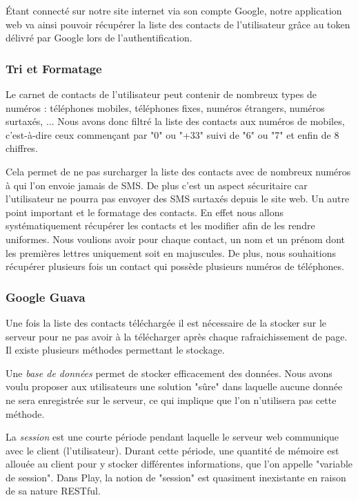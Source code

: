 Étant connecté sur notre site internet via son compte Google, notre application web va ainsi pouvoir récupérer la liste des contacts de l'utilisateur grâce au token délivré par Google lors de l'authentification.


\subsubsection{Tri et Formatage}

Le carnet de contacts de l'utilisateur peut contenir de nombreux types de numéros : téléphones mobiles, téléphones fixes, numéros étrangers, numéros surtaxés, ...
Nous avons donc filtré la liste des contacts aux numéros de mobiles, c'est-à-dire ceux commençant par "0" ou "+33" suivi de "6" ou "7" et enfin de 8 chiffres.

Cela permet de ne pas surcharger la liste des contacts avec de nombreux numéros à qui l'on envoie jamais de SMS.
De plus c'est un aspect sécuritaire car l'utilisateur ne pourra pas envoyer des SMS surtaxés depuis le site web.
Un autre point important et le formatage des contacts.
En effet nous allons systématiquement récupérer les contacts et les modifier afin de les rendre uniformes.
Nous voulions avoir pour chaque contact, un nom et un prénom
dont les premières lettres uniquement soit en majuscules.
De plus, nous souhaitions récupérer plusieurs fois un contact qui possède plusieurs numéros de téléphones.


\subsubsection{Google Guava}

Une fois la liste des contacts téléchargée il est nécessaire de la stocker sur le serveur pour ne pas avoir à la télécharger après chaque rafraichissement de page.
Il existe plusieurs méthodes permettant le stockage.

Une \textit{base de données} permet de stocker efficacement des données.
Nous avons voulu proposer aux utilisateurs une solution "sûre" dans laquelle aucune donnée ne sera enregistrée sur le serveur, ce qui implique que l'on n'utilisera pas cette méthode.

La \textit{session} est une courte période pendant laquelle le serveur web communique avec le client (l'utilisateur).
Durant cette période, une quantité de mémoire est allouée au client pour y stocker différentes informations, que l'on appelle "variable de session".
Dans Play, la notion de "session" est quasiment inexistante en raison de sa nature RESTful.


